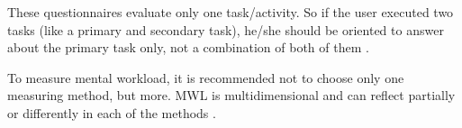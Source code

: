             These questionnaires evaluate only one task/activity. So if the user executed two tasks (like a primary and secondary task), he/she should be oriented to answer about the primary task only, not a combination of both of them \cite{sanders1998human}.

        To measure mental workload, it is recommended not to choose only one measuring method, but more. MWL is multidimensional and can reflect partially or differently in each of the methods \cite{sanders1998human}.